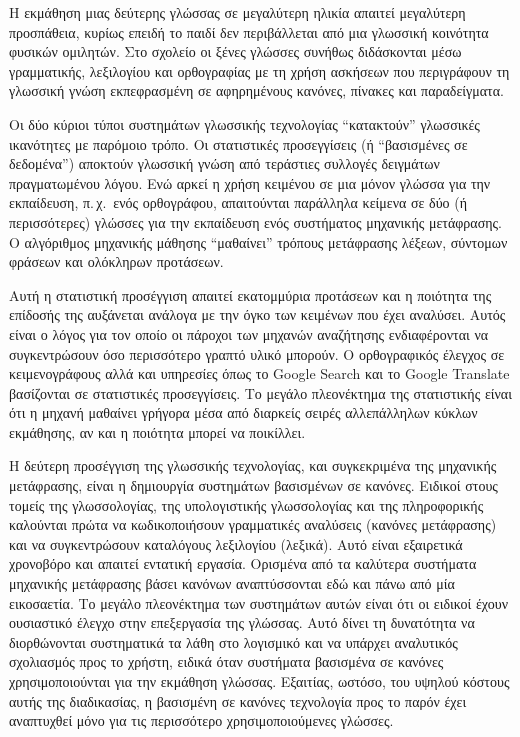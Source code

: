 \documentclass[]{../../metanetpaper}
\begin{document}
\begin{multicols}{2}
Η εκμάθηση μιας δεύτερης γλώσσας σε μεγαλύτερη ηλικία απαιτεί μεγαλύτερη προσπάθεια, κυρίως επειδή το παιδί δεν περιβάλλεται από μια γλωσσική κοινότητα φυσικών ομιλητών. Στο σχολείο οι ξένες γλώσσες συνήθως διδάσκονται μέσω  γραμματικής, λεξιλογίου και ορθογραφίας με τη χρήση ασκήσεων που περιγράφουν τη γλωσσική γνώση εκπεφρασμένη σε αφηρημένους κανόνες, πίνακες και παραδείγματα. 

Οι δύο κύριοι τύποι συστημάτων γλωσσικής τεχνολογίας “κατακτούν” γλωσσικές ικανότητες με παρόμοιο τρόπο. Οι στατιστικές προσεγγίσεις (ή “βασισμένες σε δεδομένα”) αποκτούν γλωσσική γνώση από τεράστιες συλλογές δειγμάτων πραγματωμένου λόγου. Ενώ αρκεί η χρήση κειμένου σε μια μόνον γλώσσα για την εκπαίδευση, π.\,χ.~ενός ορθογράφου, απαιτούνται παράλληλα κείμενα σε δύο (ή περισσότερες) γλώσσες για την εκπαίδευση ενός συστήματος μηχανικής μετάφρασης. Ο  αλγόριθμος μηχανικής μάθησης “μαθαίνει” τρόπους μετάφρασης λέξεων, σύντομων φράσεων και ολόκληρων προτάσεων. 

Αυτή η στατιστική προσέγγιση απαιτεί εκατομμύρια προτάσεων και η ποιότητα της επίδοσής της αυξάνεται ανάλογα με την όγκο των κειμένων που έχει αναλύσει. Αυτός είναι ο λόγος για τον οποίο οι πάροχοι των μηχανών αναζήτησης ενδιαφέρονται να συγκεντρώσουν όσο περισσότερο γραπτό υλικό μπορούν. Ο ορθογραφικός έλεγχος σε κειμενογράφους αλλά και υπηρεσίες όπως το Google Search και το Google Translate  βασίζονται σε στατιστικές προσεγγίσεις. Το μεγάλο πλεονέκτημα της στατιστικής είναι ότι η μηχανή μαθαίνει γρήγορα μέσα από διαρκείς σειρές αλλεπάλληλων κύκλων εκμάθησης, αν και η ποιότητα μπορεί να ποικίλλει.

Η δεύτερη προσέγγιση της γλωσσικής τεχνολογίας, και συγκεκριμένα της μηχανικής μετάφρασης, είναι η δημιουργία συστημάτων βασισμένων σε κανόνες. Ειδικοί στους τομείς της γλωσσολογίας, της υπολογιστικής γλωσσολογίας και της πληροφορικής καλούνται πρώτα να κωδικοποιήσουν γραμματικές αναλύσεις (κανόνες μετάφρασης) και να συγκεντρώσουν καταλόγους λεξιλογίου (λεξικά). Αυτό είναι εξαιρετικά χρονοβόρο και απαιτεί εντατική εργασία. Ορισμένα από τα καλύτερα συστήματα μηχανικής μετάφρασης βάσει κανόνων αναπτύσσονται εδώ και πάνω από μία εικοσαετία. Το μεγάλο πλεονέκτημα των συστημάτων αυτών είναι ότι οι ειδικοί έχουν ουσιαστικό έλεγχο στην επεξεργασία της γλώσσας. Αυτό δίνει τη δυνατότητα να διορθώνονται συστηματικά τα λάθη στο λογισμικό και να υπάρχει αναλυτικός σχολιασμός προς το χρήστη, ειδικά όταν συστήματα βασισμένα σε κανόνες χρησιμοποιούνται για την εκμάθηση γλώσσας. Εξαιτίας, ωστόσο, του υψηλού κόστους αυτής της διαδικασίας, η βασισμένη σε  κανόνες τεχνολογία προς το παρόν έχει αναπτυχθεί μόνο για τις περισσότερο χρησιμοποιούμενες γλώσσες. 


\end{multicols}
\end{document}
